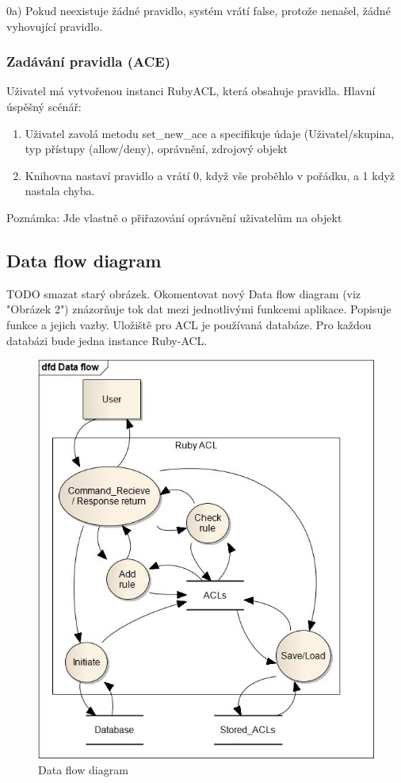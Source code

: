0a) Pokud neexistuje žádné pravidlo, systém vrátí false, protože nenašel, žádné vyhovující pravidlo.

\subsubsection{Zadávání pravidla (ACE)}
Uživatel má vytvořenou instanci RubyACL, která obsahuje pravidla.
Hlavní úspěšný scénář:
\begin{enumerate}
\item Uživatel zavolá metodu set\_new\_ace a specifikuje údaje (Uživatel/skupina, typ přístupy (allow/deny), oprávnění, zdrojový objekt
\item Knihovna nastaví pravidlo a vrátí 0, když vše proběhlo v pořádku, a 1 když nastala chyba.
\end{enumerate}
Poznámka: Jde vlastně o přiřazování oprávnění uživatelům na objekt






\subsection{Data flow diagram}
TODO smazat starý obrázek. Okomentovat nový
Data flow diagram (viz "Obrázek 2") znázorňuje tok dat mezi jednotlivými funkcemi aplikace. Popisuje funkce a jejich vazby. Uložiště pro ACL je používaná databáze. Pro každou databázi bude jedna instance Ruby-ACL.
\begin{figure}
\includegraphics[width=15cm]{DataFlowBigFont.jpg}
\caption{Data flow diagram}
\label{fig:Data flow diagram}
\end{figure}

